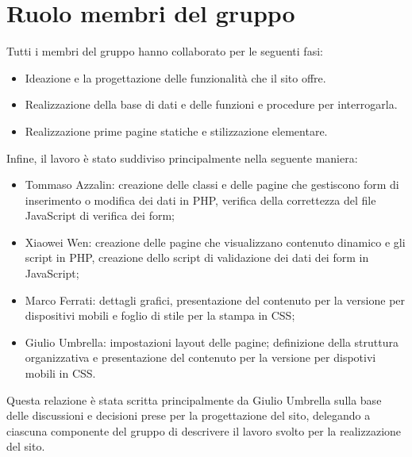 \documentclass[1_relazione.tex]{subfiles}
\begin{document}
\section{Ruolo membri del gruppo}
Tutti i membri del gruppo hanno collaborato per le seguenti fasi:
\begin{itemize}
\item Ideazione e la progettazione delle funzionalità che il sito offre.
\item Realizzazione della base di dati e delle funzioni e procedure per interrogarla.
\item Realizzazione prime pagine statiche e stilizzazione elementare.
\end{itemize}

Infine, il lavoro è stato suddiviso principalmente nella seguente maniera:
\begin{itemize}
    \item Tommaso Azzalin: creazione delle classi e delle pagine che gestiscono form di inserimento o modifica dei dati in PHP, verifica della correttezza del file JavaScript di verifica dei form;
    \item Xiaowei Wen: creazione delle pagine che visualizzano contenuto dinamico e gli script in PHP, creazione dello script di validazione dei dati dei form in JavaScript;
    \item Marco Ferrati: dettagli grafici, presentazione del contenuto per la versione per dispositivi mobili e foglio di stile per la stampa in CSS;
    \item Giulio Umbrella: impostazioni layout delle pagine;  definizione della struttura organizzativa e presentazione del contenuto per la versione per dispotivi mobili in CSS.
\end{itemize}
Questa relazione è stata scritta principalmente da Giulio Umbrella sulla base delle discussioni e decisioni prese per la progettazione del sito, delegando a ciascuna componente del gruppo di descrivere il lavoro svolto per la realizzazione del sito.
\end{document}
